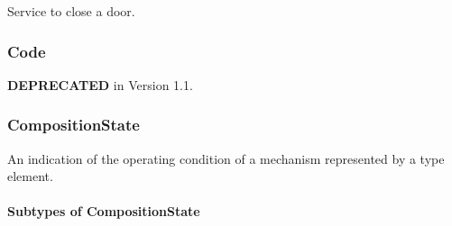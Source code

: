Service to close a door.


\subsubsection{Code}
\label{sec:Code}



\textbf{DEPRECATED} in Version 1.1.


\subsubsection{CompositionState}
\label{sec:CompositionState}



An indication of the operating condition of a mechanism represented by a  type element.


\paragraph{Subtypes of CompositionState}\mbox{}
\label{sec:Subtypes of CompositionState}

